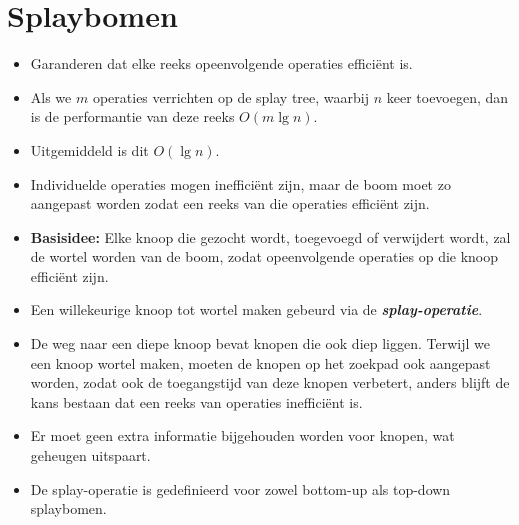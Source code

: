 \section{Splaybomen}
\label{sec:splaybomen}
\begin{itemize}
    \item Garanderen dat elke reeks opeenvolgende operaties efficiënt is.
    \item Als we $m$ operaties verrichten op de splay tree, waarbij $n$ keer toevoegen, dan is de performantie van deze reeks $O(m \lg n)$. 
    \item Uitgemiddeld is dit $O(\lg n)$.
    \item Individuelde operaties mogen inefficiënt zijn, maar de boom moet zo aangepast worden zodat een reeks van die operaties efficiënt zijn.
    \item \textbf{Basisidee:} Elke knoop die gezocht wordt, toegevoegd of verwijdert wordt, zal de wortel worden van de boom, zodat opeenvolgende operaties op die knoop efficiënt zijn.
    \item Een willekeurige knoop tot wortel maken gebeurd via de \textbf{\textit{splay-operatie}}.
    \item De weg naar een diepe knoop bevat knopen die ook diep liggen. Terwijl we een knoop wortel maken, moeten de knopen op het zoekpad ook aangepast worden, zodat ook de toegangstijd van deze knopen verbetert, anders blijft de kans bestaan dat een reeks van operaties inefficiënt is.
    \item Er moet geen extra informatie bijgehouden worden voor knopen, wat geheugen uitspaart. 
    \item De splay-operatie is gedefinieerd voor zowel bottom-up als top-down splaybomen.
\end{itemize}

